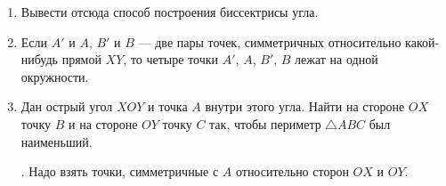 \documentclass[twoside]{book}
\begin{document}
\begin{enumerate}
 \item
Вывести отсюда способ построения биссектрисы угла.

 \item
Если $A'$ и $A$, $B'$ и $B$ — две пары точек, симметричных относительно какой-нибудь прямой $XY$, то четыре точки $A'$, $A$, $B'$, $B$ лежат на одной окружности.

 \item
Дан острый угол $XOY$ и точка $A$ внутри этого угла.
Найти на стороне $OX$ точку $B$ и на стороне $OY$ точку $C$ так, чтобы периметр $\triangle ABC$ был наименьший.

\smallskip
{}.
Надо взять точки, симметричные с $A$ относительно сторон $OX$ и $OY$.

\end{enumerate}

\begin{center}
\end{center}
\end{document}
